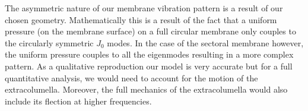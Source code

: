 The asymmetric nature of our membrane vibration pattern is a result of our chosen geometry.
Mathematically this is a result of the fact that a uniform pressure (on the membrane surface) on a full circular membrane only couples to the circularly symmetric $J_0$ modes.
In the case of the sectoral membrane however, the uniform pressure couples to all the eigenmodes resulting in a more complex pattern.
As a qualitative reproduction our model is very accurate but for a full quantitative analysis, we would 
need to account for the motion of the extracolumella. Moreover, the full mechanics of the extracolumella would 
also include its flection at higher frequencies.

